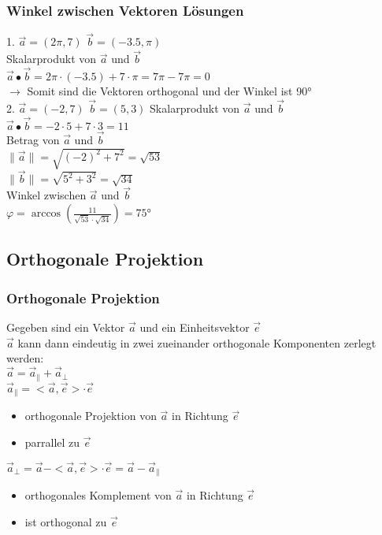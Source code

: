 \begin{frame}
	\frametitle{Winkel zwischen Vektoren Lösungen}
	1. $\vec{a} = (2\pi, 7)$ $\vec{b} = (-3.5, \pi)$ \\
	Skalarprodukt von $\vec{a}$ und $\vec{b}$ \\
	$\vec{a} \bullet \vec{b} = 2\pi \cdot (-3.5) + 7 \cdot \pi = 7\pi - 7\pi = 0$ \\
	$\rightarrow$ Somit sind die Vektoren orthogonal und der Winkel ist 90° \\
	$ $ \\
	2. $\vec{a} = (-2, 7)$ $\vec{b} = (5, 3)$
	Skalarprodukt von $\vec{a}$ und $\vec{b}$ \\
	$\vec{a} \bullet \vec{b} = -2 \cdot 5 + 7 \cdot 3 = 11$ \\
	Betrag von $\vec{a}$ und $\vec{b}$ \\
	$\lVert \vec{a} \rVert = \sqrt{(-2)^2 + 7^2} = \sqrt{53}$ \\
	$\lVert \vec{b} \rVert = \sqrt{5^2 + 3^2} = \sqrt{34}$ \\
	Winkel zwischen $\vec{a}$ und $\vec{b}$ \\
	$\varphi = \arccos(\frac{11}{\sqrt{53} \cdot \sqrt{34}}) = 75$°
\end{frame}
		
\subsection{Orthogonale Projektion}
\begin{frame}
	\frametitle{Orthogonale Projektion}
	Gegeben sind ein Vektor $\vec{a}$ und ein Einheitsvektor $\vec{e}$\\
	$\vec{a}$ kann dann eindeutig in zwei zueinander orthogonale Komponenten zerlegt werden:\\
	$\vec{a} = \vec{a}_{\parallel} + \vec{a}_{\perp}$ \\
	$ $\\
	$\vec{a}_{\parallel} = < \vec{a}, \vec{e}> \cdot \vec{e}$ \\
	\begin{itemize}
		\item orthogonale Projektion von $\vec{a}$ in Richtung $\vec{e}$ 
		\item parrallel zu $\vec{e}$
	\end{itemize}
	$\vec{a}_{\perp} = \vec{a} - <\vec{a}, \vec{e}> \cdot \vec{e} = \vec{a} - \vec{a}_{\parallel}$
	\begin{itemize}
		\item orthogonales Komplement von $\vec{a}$ in Richtung $\vec{e}$
		\item ist orthogonal zu $\vec{e}$
	\end{itemize}
\end{frame}

